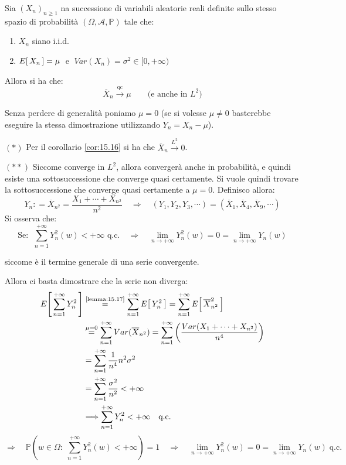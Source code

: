 \begin{teorema}
    Sia $(X_n)_{n\geq 1}$ na successione di variabili aleatorie reali definite sullo stesso spazio di probabilità $(\Omega, \mathcal{A}, \mathbb{P})$ tale che:
    \begin{enumerate}
        \item $X_n$ siano i.i.d.
        \item $E\!\left[\,X_n\,\right] = \mu \;$ e $\; Var(X_n) = \sigma^2\in [0, +\infty)$
    \end{enumerate}
    Allora si ha che:
    \[\overline{X}_n \overset{\text{qc}}{\longrightarrow}\mu \qquad \text{(e anche in $L^2$)}\] 
\end{teorema}
\begin{dimostrazione}
        Senza perdere di generalità poniamo $\mu = 0$ (se si volesse $\mu\neq 0$ basterebbe eseguire la stessa dimostrazione utilizzando $Y_n = X_n - \mu$).

        \medskip \noindent $(*)$ Per il corollario \ref{cor:15.16} si ha che $\overline{X}_n \overset{L^2}{\longrightarrow}0$.
        
        \medskip \noindent $(* *)$ Siccome converge in $L^2$, allora convergerà anche in probabilità, e quindi esiste una sottosuccessione che converge quasi certamente. Si vuole quindi trovare la sottosuccessione che converge quasi certamente a $\mu = 0$. Definisco allora:
        \[Y_n : = \overline{X}_{n^2} = \frac{X_1 + \cdots + X_{n^2}}{n^2} \quad \Rightarrow\quad (Y_1, Y_2, Y_3, \cdots ) = (\overline{X}_1, \overline{X}_4, \overline{X}_9, \cdots)\]
        Si osserva che:
        \[\text{Se: }\; \sum_{n=1}^{+\infty} Y_n^2(w) < + \infty \text{ q.c.}\quad \Rightarrow\quad \lim_{n\to+\infty} Y^2_n(w) = 0 = \lim_{n\to+\infty} Y_n(w)\]
        
        siccome è il termine generale di una serie convergente.
        
        \medskip \noindent Allora ci basta dimostrare che la serie non diverga:
        \begin{align*}
            E\!\left[\,\sum_{n=1}^{+\infty} Y_n^2\,\right] & \overset{\text{\ref{lemma:15.17}}}{=} \sum_{n=1}^{+\infty} E\!\left[\,Y_n^2\,\right] = \sum_{n=1}^{+\infty} E\!\left[\,\overline{X}_{n^2}^2\,\right] \\
            & \overset{\mu = 0}{=} \sum_{n=1}^{+\infty}Var(\overline{X}_{n^2})  = \sum_{n=1}^{+\infty}\left(\frac{Var(X_1+\cdots+X_{n^2})}{n^4}\right) \\
            & = \sum_{n=1}^{+\infty}\frac{1}{n^4}n^2\sigma^2 \\
            & = \sum_{n=1}^{+\infty}\frac{\sigma^2}{n^2} < +\infty \\
            & \Longrightarrow \sum_{n=1}^{+\infty} Y_n^2 < +\infty \quad \text{q.c.}
        \end{align*}
        \[\Rightarrow \quad \mathbb P\left(w\in \Omega:\; \sum_{n=1}^{+\infty}Y_n^2 (w) <+\infty \right) = 1 \quad \Rightarrow \quad \lim_{n\to+\infty} Y^2_n(w) = 0 = \lim_{n\to+\infty} Y_n(w)\;\text{q.c.}\]


\end{dimostrazione}
